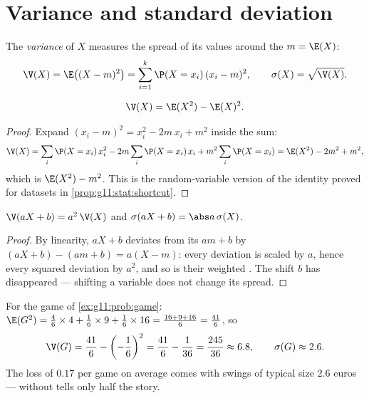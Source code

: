 \section{Variance and standard deviation}

\begin{definition}[Variance]\label{def:g11:prob:variance}
The \emph{variance} of $X$ measures the spread of its
values around the  $m = \E(X)$:
\[
\V(X) = \E\bigl((X - m)^2\bigr)
= \sum_{i=1}^{k} \P(X = x_i)\,(x_i - m)^2,
\qquad
\sigma(X) = \sqrt{\V(X)} .
\]
\end{definition}

\begin{proposition}\label{prop:g11:prob:konig}
\[
\V(X) = \E(X^2) - \E(X)^2 .
\]
\end{proposition}

\begin{proof}
Expand $(x_i - m)^2 = x_i^2 - 2m\,x_i + m^2$ inside the sum:
\[
\V(X) = \sum_i \P(X = x_i)\,x_i^2
- 2m \sum_i \P(X = x_i)\,x_i + m^2\sum_i \P(X = x_i)
= \E(X^2) - 2m^2 + m^2 ,
\]
which is $\E(X^2) - m^2$. This is the random-variable version of the
identity proved for datasets in \cref{prop:g11:stat:shortcut}.
\end{proof}

\begin{proposition}\label{prop:g11:prob:affine}
$\V(aX + b) = a^2\,\V(X)$ and $\sigma(aX + b) = \abs a\,\sigma(X)$.
\end{proposition}

\begin{proof}
By linearity, $aX + b$ deviates from its  $a m + b$ by
$(aX + b) - (am + b) = a(X - m)$: every deviation is scaled by $a$, hence
every squared deviation by $a^2$, and so is their weighted . The
shift $b$ has disappeared --- shifting a variable does not change its
spread.
\end{proof}

\begin{example}\label{ex:g11:prob:variance}
For the game of \cref{ex:g11:prob:game}:
$\E(G^2) = \frac46 \times 4 + \frac16 \times 9 + \frac16 \times 16
= \frac{16 + 9 + 16}{6} = \frac{41}{6}$, so
\[
\V(G) = \frac{41}{6} - \left(-\frac16\right)^2
= \frac{41}{6} - \frac{1}{36} = \frac{245}{36} \approx 6.8,
\qquad
\sigma(G) \approx 2.6 .
\]
The loss of $0.17$ per game on average comes with swings of typical size
$2.6$ euros ---  without  tells only half
the story.
\end{example}

